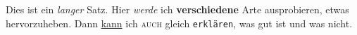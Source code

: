 \documentclass{scrartcl}
\begin{document}
  Dies ist ein \emph{langer} Satz. Hier \textit{werde} ich \textbf{verschiedene} Arte \textsf{ausprobieren}, etwas \textrm{hervorzuheben}. Dann \underline{kann} ich \textsc{auch} gleich \texttt{erklären}, was gut ist und was nicht.
\end{document}
